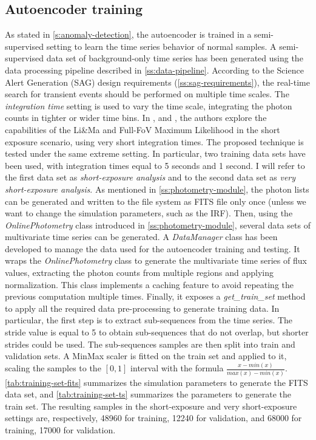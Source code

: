 \subsection{Autoencoder training}
\label{ss:training}
As stated in \autoref{s:anomaly-detection}, the autoencoder is trained in a semi-supervised setting to learn the time series behavior of normal samples. A semi-supervised data set of background-only time series has been generated using the data processing pipeline described in \autoref{ss:data-pipeline}. According to the Science Alert Generation (SAG) design requirements (\autoref{ss:sag-requirements}), the real-time search for transient events should be performed on multiple time scales. The \textit{integration time} setting is used to vary the time scale, integrating the photon counts in tighter or wider time bins. In \cite{tampieri2020real}, and \cite{di2021detection}, the authors explore the capabilities of the Li\&Ma and Full-FoV Maximum Likelihood in the short exposure scenario, using very short integration times. The proposed technique is tested under the same extreme setting. In particular, two training data sets have been used, with integration times equal to 5 seconds and 1 second. I will refer to the first data set as \textit{short-exposure analysis} and to the second data set as \textit{very short-exposure analysis}. As mentioned in \autoref{ss:photometry-module}, the photon lists can be generated and written to the file system as FITS file only once (unless we want to change the simulation parameters, such as the IRF). Then, using the \textit{OnlinePhotometry} class introduced in \autoref{ss:photometry-module}, several data sets of multivariate time series can be generated. A \textit{DataManager} class has been developed to manage the data used for the autoencoder training and testing. It wraps the \textit{OnlinePhotometry} class to generate the multivariate time series of flux values, extracting the photon counts from multiple regions and applying normalization. This class implements a caching feature to avoid repeating the previous computation multiple times. Finally, it exposes a \textit{get\_train\_set} method to apply all the required data pre-processing to generate training data. In particular, the first step is to extract sub-sequences from the time series. The stride value is equal to 5 to obtain sub-sequences that do not overlap, but shorter strides could be used. The sub-sequences samples are then split into train and validation sets. A MinMax scaler is fitted on the train set and applied to it, scaling the samples to the $[0, 1]$ interval with the formula $ \frac{x-min(x)}{max(x)-min(x)}$. \autoref{tab:training-set-fits} summarizes the simulation parameters to generate the FITS data set, and \autoref{tab:training-set-ts} summarizes the parameters to generate the train set. The resulting samples in the short-exposure and very short-exposure settings are, respectively, 48960 for training, 12240 for validation, and 68000 for training, 17000 for validation. 
